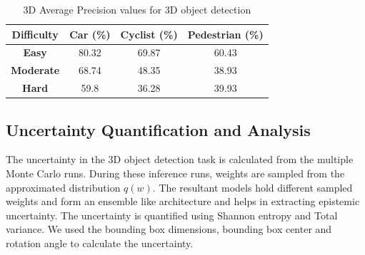 \documentclass[10pt,twocolumn,letterpaper]{article}
\begin{document}
\begin{table}[!htbp]
    \centering
    \begin{tabular}{|c|c|c|c|}
        \hline \textbf{Difficulty} & \textbf{Car (\%)} & \textbf{Cyclist (\%)} & \textbf{Pedestrian (\%)}  \\
        \hline \textbf{Easy} & 80.32  & 69.87  & 60.43 \\
        \hline \textbf{Moderate} & 68.74  & 48.35 & 38.93 \\
        \hline \textbf{Hard} & 59.8  & 36.28  & 39.93  \\
        \hline
    \end{tabular}
	\caption[3D AP calculated for 2D proposals generated from 3D Annotations]{3D Average Precision values for 3D object detection }
	\label{3DAP_Values-2}
    \end{table}
\subsection{Uncertainty Quantification and Analysis}
The uncertainty in the 3D object detection task is calculated from the multiple Monte Carlo runs. During these inference runs, weights are sampled from the approximated distribution $q(w)$. The resultant models hold different sampled weights and form an ensemble like architecture and helps in extracting epistemic uncertainty. The uncertainty is quantified using Shannon entropy and Total variance. We used the bounding box dimensions, bounding box center and rotation angle to calculate the uncertainty.
\end{document}
